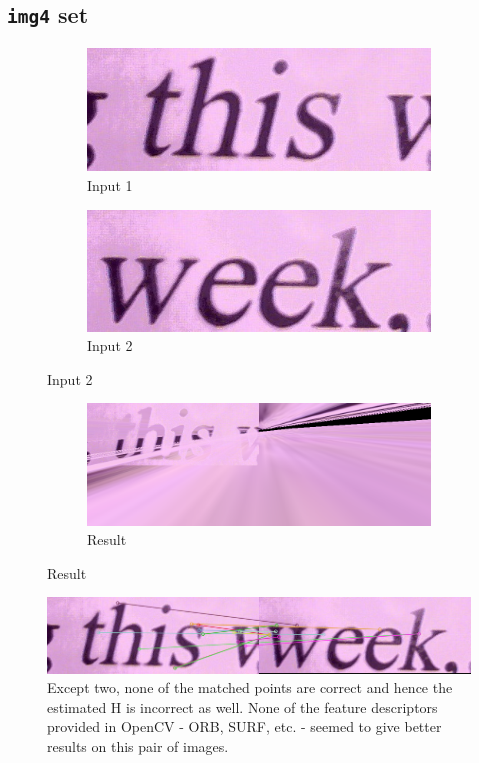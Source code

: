 \documentclass[a4paper,11]{article}
\begin{document}
  \subsection{\texttt{img4} set}
  \begin{figure}[H]
    \begin{subfigure}{.5\textwidth}
      \centering
      \includegraphics[width=.8\linewidth]{img4_1}
      \caption{Input 1}
    \end{subfigure}
    \begin{subfigure}{.5\textwidth}
      \centering
      \includegraphics[width=.8\linewidth]{img4_2}
      \caption{Input 2}
    \end{subfigure}
    \end{figure}
    \begin{figure}\ContinuedFloat
    \begin{subfigure}{\textwidth}
      \centering
      \includegraphics[width=.8\linewidth]{mosaic4}
      \caption{Result}
    \end{subfigure}
  \end{figure}
  
  \begin{figure}[H]
    \centering
    \includegraphics[width=0.8\linewidth]{sift-failure}
    \caption{Except two, none of the matched points are correct and hence the estimated H is incorrect as well. None of the feature descriptors provided in OpenCV - ORB, SURF, etc. - seemed to give better results on this pair of images.}
  \end{figure}
  
\end{document}
